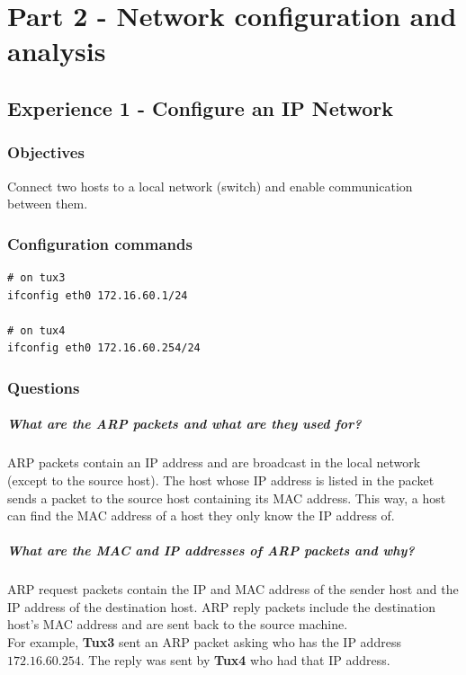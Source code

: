 \documentclass[11pt]{report}
\newcommand{\tux}[1]{\textbf{Tux#1}}
\begin{document}
\chapter{Part 2 - Network configuration and analysis}

\section{Experience 1 - Configure an IP Network}

\subsection{Objectives}
Connect two hosts to a local network (switch) and enable communication between
them.

\subsection{Configuration commands}
\begin{lstlisting}
# on tux3
ifconfig eth0 172.16.60.1/24

# on tux4
ifconfig eth0 172.16.60.254/24
\end{lstlisting}

\subsection{Questions}
\paragraph{What are the ARP packets and what are they used for?}
ARP packets contain an IP address and are broadcast in the local network
(except to the source host). The host whose IP address is listed in the packet
sends a packet to the source host containing its MAC address. This way,
a host can find the MAC address of a host they only know the IP address of.

\paragraph{What are the MAC and IP addresses of ARP packets and why?}
ARP request packets contain the IP and MAC address of the sender host and the IP
address of the destination host. ARP reply packets include the destination
host's MAC address and are sent back to the source machine.\\
For example, \tux{3} sent an ARP packet asking who has the IP address
$172.16.60.254$. The reply was sent by \tux{4} who had that IP address.
\end{document}

